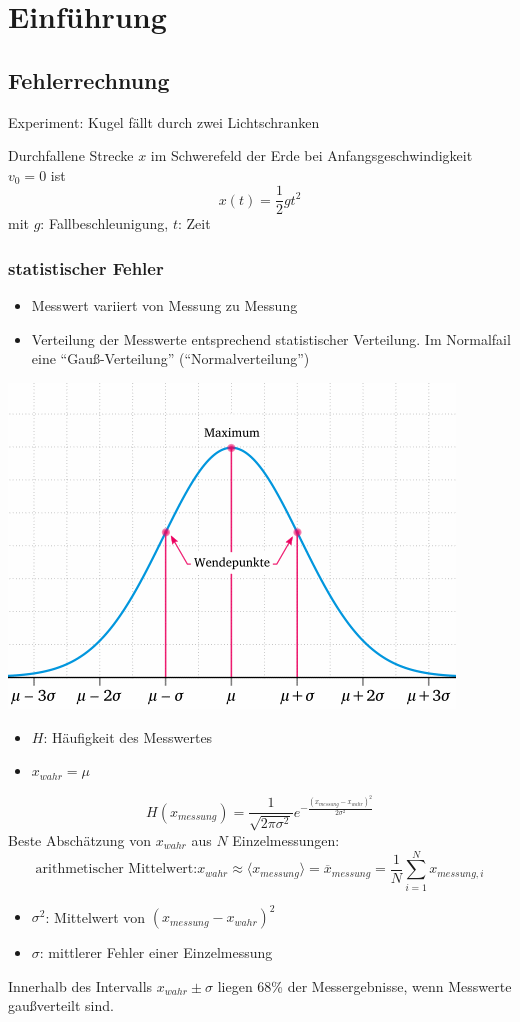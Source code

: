 \documentclass[a4paper,10pt, fleqn]{article}
\begin{document}
\section{Einführung}
\label{sec:einfuhrung-1}


\subsection{Fehlerrechnung}
\label{sec:fehlerrechnung}

Experiment: Kugel fällt durch zwei Lichtschranken

Durchfallene Strecke $x$ im Schwerefeld der Erde bei Anfangsgeschwindigkeit $v_{0} = 0$ ist
$$ x(t) = \frac{1}{2}gt^{2}$$
mit $g$: Fallbeschleunigung, $t$: Zeit

\subsubsection{statistischer Fehler}
\label{sec:statistischer-fehler}
\begin{itemize}
\item Messwert variiert von Messung zu Messung
\item Verteilung der Messwerte entsprechend statistischer Verteilung.
  Im Normalfail eine ``Gauß-Verteilung'' (``Normalverteilung'')
\end{itemize}
\includegraphics{normalverteilung01.png}
\begin{itemize}
\item $H$: Häufigkeit des Messwertes
\item $x_{wahr} = \mu$
\end{itemize}
$$H(x_{messung}) = \frac{1}{\sqrt{2\pi\sigma^{2}}}e^{-\frac{(x_{messung}-x_{wahr})^{2}}{2\sigma^{2}}}$$
Beste Abschätzung von $x_{wahr}$ aus $N$ Einzelmessungen:
$$\text{arithmetischer Mittelwert:}x_{wahr} \approx \langle  x_{messung} \rangle = \overline{x}_{messung} = \frac{1}{N}\sum_{i=1}^{N}x_{messung, i}$$
\begin{itemize}
\item $\sigma^{2}$: Mittelwert von $(x_{messung} - x_{wahr})^{2}$
\item $\sigma$: mittlerer Fehler einer Einzelmessung
\end{itemize}
Innerhalb des Intervalls $x_{wahr} \pm \sigma$ liegen 68\% der
Messergebnisse, wenn Messwerte gaußverteilt sind.
\end{document}
